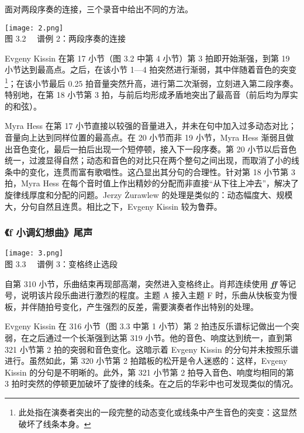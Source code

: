     面对两段序奏的连接，三个录音中给出不同的方法。


    \begin{center}\texttt{[image: 2.png]}\\
    \heiti \fontsize{10.5}{12.6}\selectfont 图 3.2 \ \ 谱例 2：两段序奏的连接
    \end{center}

    Evgeny Kissin 在第 17 小节（图 3.2 中第 4 小节）第 3 拍即开始渐强，到第 19 小节达到最高点。之后，在该小节 1—4 拍突然进行渐弱，其中伴随着音色的突变\footnote{此处指在演奏者突出的一段完整的动态变化或线条中产生音色的突变：这显然破坏了线条本身。}；在该小节最后 0.25 拍音量突然升高，进行第二次渐弱，立刻进入第二段序奏。特别地，在第 18 小节第 3 拍，与前后均形成矛盾地突出了最高音（前后均为厚实的和弦）。

    Myra Hess 在第 17 小节直接以较强的音量进入，并未在句中加入过多动态对比；音量向上达到同样位置的最高点。在 20 小节而非 19 小节，Myra Hess 渐弱且做出音色变化，最后一拍后出现一个短停顿，接入下一段序奏。第 20 小节以后音色统一，过渡显得自然；动态和音色的对比只在两个整句之间出现，而取消了小的线条中的变化，连贯而富有歌唱性。这凸显出其分句的合理性。针对第 18 小节第 3 拍，Myra Hess 在每个音时值上作出精妙的分配而非直接“从下往上冲去”，解决了旋律线厚度和分配的问题。Jerzy Żurawlew 的处理是类似的：动态幅度大、规模大，分句自然且连贯。相比之下，Evgeny Kissin 较为鲁莽。



    \subsubsection{\heiti \fontsize{14}{16.8}\selectfont 《f 小调幻想曲》尾声}


    \begin{center}\texttt{[image: 3.png]}\\
    \heiti \fontsize{10.5}{12.6}\selectfont 图 3.3 \ \ 谱例 3：变格终止选段
    \end{center}

    自第 310 小节，乐曲结束再现部高潮，突然进入变格终止。肖邦连续使用 \textit{\textbf{ff}} 等记号，说明该片段乐曲进行激烈的程度。主题 A 接入主题 F 时，乐曲从快板变为慢板，并伴随拍号变化，产生强烈的反差，需要演奏者作出特别的处理。

    Evgeny Kissin 在 316 小节（图 3.3 中第 1 小节）第 2 拍违反乐谱标记做出一个突弱，在之后通过一个长渐强到达第 319 小节。他的音色、响度达到统一，直到第 321 小节第 2 拍的突弱和音色变化。这暗示着 Evgeny Kissin 的分句并未按照乐谱进行。虽然如此，第 320 小节第 2 拍踏板的松开是令人迷惑的：这样，Evgeny Kissin 的分句是不明晰的。此外，第 321 小节第 2 拍导入音色、响度均相同的第 3 拍时突然的停顿更加破坏了旋律的线条。在之后的华彩中也可发现类似的情况。

